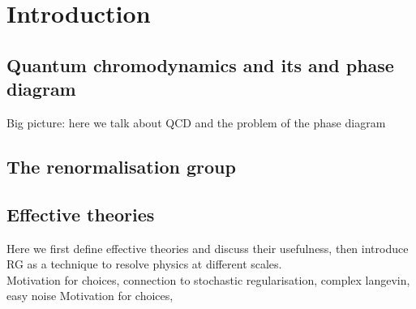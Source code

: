 \chapter{Introduction}
\label{chap:introduction}

\section{Quantum chromodynamics and its and phase diagram}
Big picture: here we talk about QCD and the problem of the phase diagram
\section{The renormalisation group}
\section{Effective theories}
Here we first define effective theories and discuss their usefulness, then introduce RG as a technique to resolve physics at different scales. \\
\vspace{20pt}
Motivation for choices, connection to stochastic regularisation, complex langevin, easy noise \cite{boo}
Motivation for choices, 